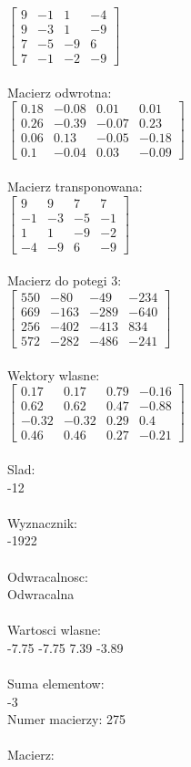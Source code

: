 \documentclass[a4paper,12pt]{article}
\begin{document}
$\begin{bmatrix} 9&-1&1&-4\\9&-3&1&-9\\7&-5&-9&6\\7&-1&-2&-9 \end{bmatrix}$
\\
\\
Macierz odwrotna:\\

$\begin{bmatrix} 0.18&-0.08&0.01&0.01\\0.26&-0.39&-0.07&0.23\\0.06&0.13&-0.05&-0.18\\0.1&-0.04&0.03&-0.09 \end{bmatrix}$
\\
\\
Macierz transponowana:\\

$\begin{bmatrix} 9&9&7&7\\-1&-3&-5&-1\\1&1&-9&-2\\-4&-9&6&-9 \end{bmatrix}$
\\
\\
Macierz do potegi 3:\\

$\begin{bmatrix} 550&-80&-49&-234\\669&-163&-289&-640\\256&-402&-413&834\\572&-282&-486&-241 \end{bmatrix}$
\\
\\
Wektory wlasne:\\

$\begin{bmatrix} 0.17&0.17&0.79&-0.16\\0.62&0.62&0.47&-0.88\\-0.32&-0.32&0.29&0.4\\0.46&0.46&0.27&-0.21 \end{bmatrix}$
\\
\\
Slad:\\
-12
\\
\\
Wyznacznik:\\
-1922
\\
\\
Odwracalnosc:\\
Odwracalna
\\
\\
Wartosci wlasne:\\
-7.75 -7.75 7.39 -3.89
\\
\\
Suma elementow:\\
-3
\\
\newpage
Numer macierzy:
275
\\
\\
Macierz:\\
\end{document}
